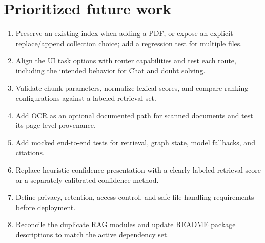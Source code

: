 \section{Prioritized future work}
\begin{enumerate}
  \item Preserve an existing index when adding a PDF, or expose an explicit replace/append collection choice; add a regression test for multiple files.
  \item Align the UI task options with router capabilities and test each route, including the intended behavior for Chat and doubt solving.
  \item Validate chunk parameters, normalize lexical scores, and compare ranking configurations against a labeled retrieval set.
  \item Add OCR as an optional documented path for scanned documents and test its page-level provenance.
  \item Add mocked end-to-end tests for retrieval, graph state, model fallbacks, and citations.
  \item Replace heuristic confidence presentation with a clearly labeled retrieval score or a separately calibrated confidence method.
  \item Define privacy, retention, access-control, and safe file-handling requirements before deployment.
  \item Reconcile the duplicate RAG modules and update README package descriptions to match the active dependency set.
\end{enumerate}
